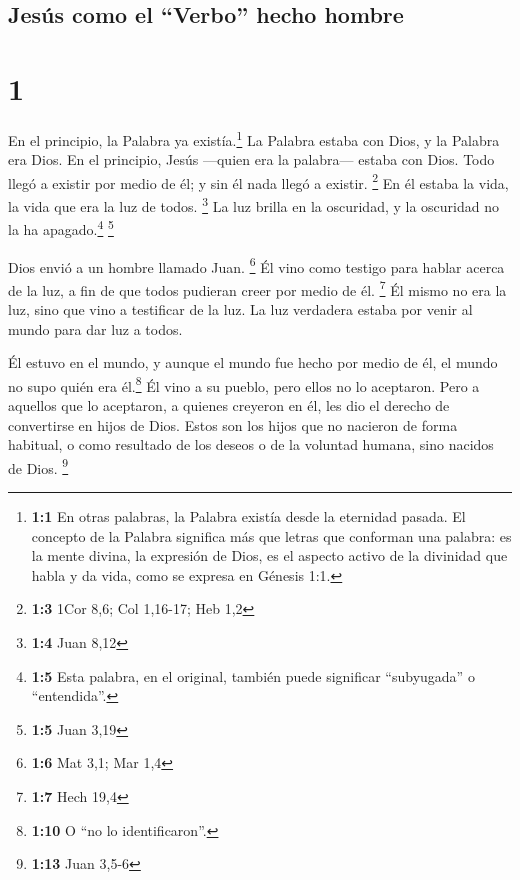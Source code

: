\hypertarget{jesuxfas-como-el-verbo-hecho-hombre}{%
\subsection{Jesús como el ``Verbo'' hecho
hombre}\label{jesuxfas-como-el-verbo-hecho-hombre}}

\hypertarget{section}{%
\section{1}\label{section}}

 En el principio, la Palabra ya existía.\footnote{\textbf{1:1}
  En otras palabras, la Palabra existía desde la eternidad pasada. El
  concepto de la Palabra significa más que letras que conforman una
  palabra: es la mente divina, la expresión de Dios, es el aspecto
  activo de la divinidad que habla y da vida, como se expresa en Génesis
  1:1.} La Palabra estaba con Dios, y la Palabra era Dios.
 En el principio, Jesús ---quien era la palabra--- estaba
con Dios.  Todo llegó a existir por medio de él; y sin él
nada llegó a existir. \footnote{\textbf{1:3} 1Cor 8,6; Col 1,16-17; Heb
  1,2}  En él estaba la vida, la vida que era la luz de
todos. \footnote{\textbf{1:4} Juan 8,12}  La luz brilla en
la oscuridad, y la oscuridad no la ha apagado.\footnote{\textbf{1:5}
  Esta palabra, en el original, también puede significar ``subyugada'' o
  ``entendida''.} \footnote{\textbf{1:5} Juan 3,19}

 Dios envió a un hombre llamado Juan. \footnote{\textbf{1:6}
  Mat 3,1; Mar 1,4}  Él vino como testigo para hablar
acerca de la luz, a fin de que todos pudieran creer por medio de él.
\footnote{\textbf{1:7} Hech 19,4}  Él mismo no era la luz,
sino que vino a testificar de la luz.  La luz verdadera
estaba por venir al mundo para dar luz a todos.

 Él estuvo en el mundo, y aunque el mundo fue hecho por
medio de él, el mundo no supo quién era él.\footnote{\textbf{1:10} O
  ``no lo identificaron''.}  Él vino a su pueblo, pero
ellos no lo aceptaron.  Pero a aquellos que lo aceptaron,
a quienes creyeron en él, les dio el derecho de convertirse en hijos de
Dios.  Estos son los hijos que no nacieron de forma
habitual, o como resultado de los deseos o de la voluntad humana, sino
nacidos de Dios. \footnote{\textbf{1:13} Juan 3,5-6}

